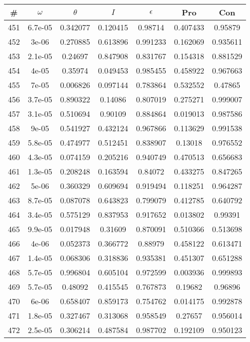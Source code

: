 \newpage
\begin{table}
\begin{tabular}{c|c|c|c|c|c|c}
\# & $\omega$ & $\theta$ & $I$ & $\epsilon$ & Pro & Con\\
\hline
451 & 6.7e-05 & 0.342077 & 0.120415 & 0.98714 & 0.407433 & 0.95879\\
452 & 3e-06 & 0.270885 & 0.613896 & 0.991233 & 0.162069 & 0.935611\\
453 & 2.1e-05 & 0.24697 & 0.847908 & 0.831767 & 0.154318 & 0.881529\\
454 & 4e-05 & 0.35974 & 0.049453 & 0.985455 & 0.458922 & 0.967663\\
455 & 7e-05 & 0.006826 & 0.097144 & 0.783864 & 0.532552 & 0.47865\\
456 & 3.7e-05 & 0.890322 & 0.14086 & 0.807019 & 0.275271 & 0.999007\\
457 & 3.1e-05 & 0.510694 & 0.90109 & 0.884864 & 0.019013 & 0.987586\\
458 & 9e-05 & 0.541927 & 0.432124 & 0.967866 & 0.113629 & 0.991538\\
459 & 5.8e-05 & 0.474977 & 0.512451 & 0.838907 & 0.13018 & 0.976552\\
460 & 4.3e-05 & 0.074159 & 0.205216 & 0.940749 & 0.470513 & 0.656683\\
461 & 1.3e-05 & 0.208248 & 0.163594 & 0.84072 & 0.433275 & 0.847265\\
462 & 5e-06 & 0.360329 & 0.609694 & 0.919494 & 0.118251 & 0.964287\\
463 & 8.7e-05 & 0.087078 & 0.643823 & 0.799079 & 0.412785 & 0.640792\\
464 & 3.4e-05 & 0.575129 & 0.837953 & 0.917652 & 0.013802 & 0.99391\\
465 & 9.9e-05 & 0.017948 & 0.31609 & 0.870091 & 0.510366 & 0.513698\\
466 & 4e-06 & 0.052373 & 0.366772 & 0.88979 & 0.458122 & 0.613471\\
467 & 1.4e-05 & 0.068306 & 0.318836 & 0.935381 & 0.451307 & 0.651288\\
468 & 5.7e-05 & 0.996804 & 0.605104 & 0.972599 & 0.003936 & 0.999893\\
469 & 5.7e-05 & 0.48092 & 0.415545 & 0.767873 & 0.19682 & 0.96896\\
470 & 6e-06 & 0.658407 & 0.859173 & 0.754762 & 0.014175 & 0.992878\\
471 & 1.8e-05 & 0.327467 & 0.313068 & 0.958549 & 0.27657 & 0.956014\\
472 & 2.5e-05 & 0.306214 & 0.487584 & 0.987702 & 0.192109 & 0.950123\\

\end{tabular}
\end{table}
